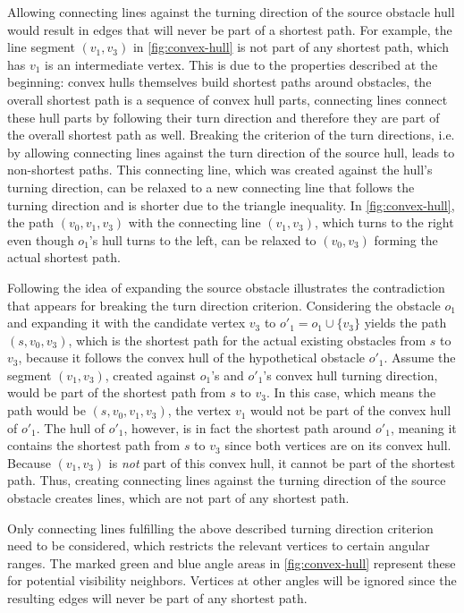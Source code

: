 			Allowing connecting lines against the turning direction of the source obstacle hull would result in edges that will never be part of a shortest path.
			For example, the line segment $(v_1, v_3)$ in \cref{fig:convex-hull} is not part of any shortest path, which has $v_1$ is an intermediate vertex.
			This is due to the properties described at the beginning:
			convex hulls themselves build shortest paths around obstacles, the overall shortest path is a sequence of convex hull parts, connecting lines connect these hull parts by following their turn direction and therefore they are part of the overall shortest path as well.
			Breaking the criterion of the turn directions, i.e. by allowing connecting lines against the turn direction of the source hull, leads to non-shortest paths.
			This connecting line, which was created against the hull's turning direction, can be relaxed to a new connecting line that follows the turning direction and is shorter due to the triangle inequality.
			In \cref{fig:convex-hull}, the path $(v_0, v_1, v_3)$ with the connecting line $(v_1, v_3)$, which turns to the right even though $o_1$'s hull turns to the left, can be relaxed to $(v_0, v_3)$ forming the actual shortest path.
			
			Following the idea of expanding the source obstacle illustrates the contradiction that appears for breaking the turn direction criterion.
			Considering the obstacle $o_1$ and expanding it with the candidate vertex $v_3$ to $o'_1=o_1 \cup \{v_3\}$ yields the path $(s, v_0, v_3)$, which is the shortest path for the actual existing obstacles from $s$ to $v_3$, because it follows the convex hull of the hypothetical obstacle $o'_1$.
			Assume the segment $(v_1, v_3)$, created against $o_1$'s and $o'_1$'s convex hull turning direction, would be part of the shortest path from $s$ to $v_3$.
			In this case, which means the path would be $(s, v_0, v_1, v_3)$, the vertex $v_1$ would not be part of the convex hull of $o'_1$.
			The hull of $o'_1$, however, is in fact the shortest path around $o'_1$, meaning it contains the shortest path from $s$ to $v_3$ since both vertices are on its convex hull.
			Because $(v_1, v_3)$ is \emph{not} part of this convex hull, it cannot be part of the shortest path.
			Thus, creating connecting lines against the turning direction of the source obstacle creates lines, which are not part of any shortest path.
			
			Only connecting lines fulfilling the above described turning direction criterion need to be considered, which restricts the relevant vertices to certain angular ranges.
			The marked green and blue angle areas in \cref{fig:convex-hull} represent these  for potential visibility neighbors.
			Vertices at other angles will be ignored since the resulting edges will never be part of any shortest path.
			
